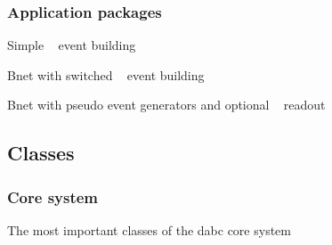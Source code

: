 \subsubsection{Application packages}
\begin{compactitem}[$\circ$]
\item  Simple \mbs~ event building
\item  Bnet with switched \mbs~ event building
\item  Bnet with pseudo event generators and optional \ABB~ readout
\end{compactitem}

\subsection{Classes}
\subsubsection{Core system}
The most important classes of the dabc core system

